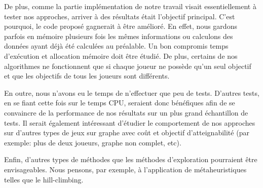 De plus, comme la partie implémentation de notre travail visait essentiellement à tester nos approches, arriver à des résultats était l'objectif principal. C'est pourquoi, le code proposé gagnerait à être amélioré. En effet, nous gardons parfois en mémoire plusieurs fois les mêmes informations ou calculons des données ayant déjà été calculées au préalable. Un bon compromis temps d'exécution et allocation mémoire doit être étudié. De plus, certains de nos algorithmes ne fonctionnent que si chaque joueur ne possède qu'un seul objectif et que les objectifs de tous les joueurs sont différents.

En outre, nous n'avons eu le temps de n'effectuer que peu de tests. D'autres tests, en se fiant cette fois sur le temps CPU, seraient donc bénéfiques afin de se convaincre de la performance de nos résultats sur un plus grand échantillon de tests. Il serait également intéressant d'étudier le comportement de nos approches sur d'autres types de jeux sur graphe avec coût et objectif d'atteignabilité  (par exemple: plus de deux joueurs, graphe non complet, etc).

Enfin, d'autres types de méthodes que les méthodes d'exploration pourraient être envisageables. Nous pensons, par exemple, à l'application de métaheuristiques telles que le hill-climbing.

